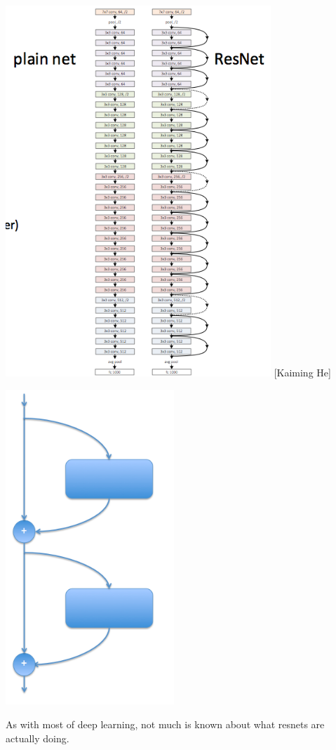 {\centerline{\includegraphics[height= 5.5in]{../images/ResnetStack} {\large [Kaiming He]}}


\vfill
\includegraphics[width= 2.5in]{../images/resnet}
\hfill \begin{minipage}[b]{4in} As with most of deep learning, not much is known about what resnets are actually doing.
  

\end{minipage}}
